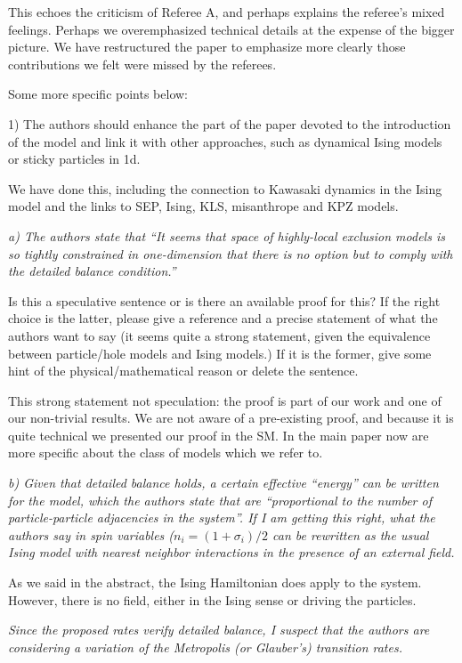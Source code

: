 \documentclass[a4paper,10pt]{article}
\begin{document}
This echoes the criticism of Referee A, and perhaps explains the
referee's mixed feelings.  Perhaps we overemphasized technical details
at the expense of the bigger picture. We have restructured the paper
to emphasize more clearly those contributions we felt were missed by
the referees.

{\it

   Some more specific points below:
  
   1) The authors should enhance the part of the paper devoted to the
   introduction of the model and link it with other approaches, such as
   dynamical Ising models or sticky particles in 1d.
}
We have done this, including the connection to Kawasaki dynamics in the Ising
model and the links to SEP, Ising, KLS, misanthrope and KPZ models.

{\it  
   a) The authors state that ``It seems that space of highly-local
   exclusion models is so tightly constrained in one-dimension that there
   is no option but to comply with the detailed balance condition.''
  
   Is this a speculative sentence or is there an available proof for
   this? If the right choice is the latter, please give a reference and a
   precise statement of what the authors want to say (it seems quite a
   strong statement, given the equivalence between particle/hole models
   and Ising models.) If it is the former, give some hint of the
   physical/mathematical reason or delete the sentence. }
  

This strong statement not speculation: the proof is part of our work 
and one of our non-trivial
results.  We are not aware of a pre-existing proof, and because it is
quite technical we presented our proof in the SM.  In the main paper
now are more specific about the class of models which we refer to.

  {\it
   b) Given that detailed balance holds, a certain effective ``energy'' can
   be written for the model, which the authors state that are
   ``proportional to the number of particle-particle adjacencies in the
   system''.
     If I am getting this right, what the authors say in spin variables
   ($n_i=(1+\sigma_i)/2$ can be rewritten as the usual Ising model with
   nearest neighbor interactions   in the presence of an external field. }

As we said in the abstract, the Ising Hamiltonian does apply to the
system. However, there is no field, either in the Ising sense or
driving the particles.

{\it
Since the proposed rates verify detailed balance, I suspect that the
   authors are considering a variation of the Metropolis (or Glauber's)
   transition rates.}
\end{document}
